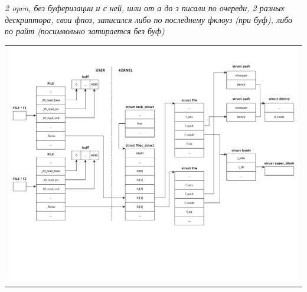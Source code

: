 \textit{2 open, без буферизации и с ней, шли от а до з писали по очереди, 2 разных дескриптора, свои фпоз, записался либо по последнему фклоуз (при буф), либо по райт (посимвольно затирается без буф)}
\begin{table}[H]
  \centering
  \begin{tabular}{p{1\linewidth}}
    \centering
    \includegraphics[width=0.8\linewidth]{./images/scheme3.pdf}
  \end{tabular}
\end{table}






